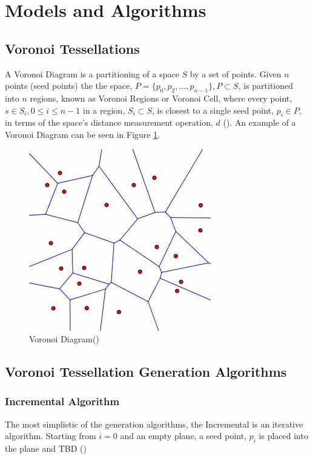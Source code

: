 \section{Models and Algorithms}\label{tes}
\subsection{Voronoi Tessellations}\label{tes:sec:vor}
A Voronoi Diagram is a partitioning of a space $S$ by a set of points. Given $n$ points (seed points) the the space, $P = \{p_0,p_2,...,p_{n-1}\}, P \subset S$, is partitioned into $n$ regions, known as Voronoi Regions or Voronoi Cell, where every point, $s \in S_i,0 \leq i \leq n-1$ in a region, $S_i \subset S$, is closest to a single seed point, $p_i \in P$, in terms of the space's distance measurement operation, $d$ (\cite{okabe2009spatial}). An example of a Voronoi Diagram can be seen in Figure \ref{tes:fig:voreg}.
\begin{figure}[H]
	\centering
    \label{tes:fig:voreg}
    \includegraphics[scale=0.65]{Images/voronoi.jpg}
    \caption{Voronoi Diagram(\cite{voronoipic})}
\end{figure}
\subsection{Voronoi Tessellation Generation Algorithms}\label{tes:sec:tga}
%
\subsubsection{Incremental Algorithm}\label{tes:ssec:inc}
The most simplistic of the generation algorithms, the Incremental is an iterative algorithm. Starting from $i=0$ and an empty plane, a seed point, $p_i$ is placed into the plane and TBD (\cite{green1978computing})
%
